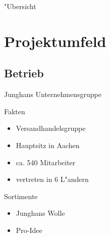 \date{\theDate}

\frenchspacing



\setcounter{framenumber}{0} 
\begin{frame}
  \maketitle
\end{frame}

\setcounter{figure}{0}

\begin{frame}{"Ubersicht}
  \tableofcontents
\end{frame}

\section{Projektumfeld}

\subsection{Betrieb}
\begin{frame}[<+->]{Junghans Unternehmensgruppe}
			\begin{block}{Fakten}
				\begin{itemize}[<+->]
						\item Versandhandelsgruppe
						\item Hauptsitz in Aachen
						\item ca. 540 Mitarbeiter
						\item vertreten in 6 L"andern
				\end{itemize}
			\end{block}

			\begin{block}{Sortimente}
				\begin{itemize}[<+->]
						\item Junghans Wolle
						\item Pro-Idee
				\end{itemize}
			\end{block}
\end{frame}

